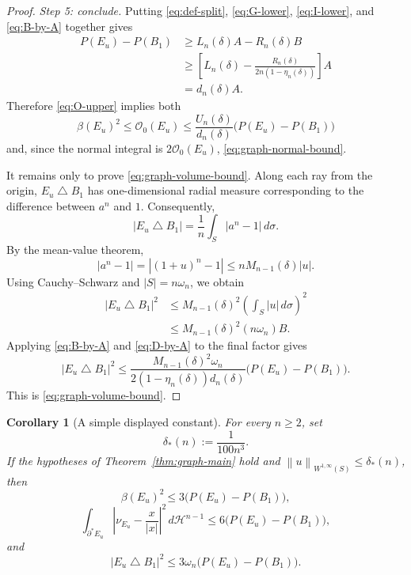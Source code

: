 \documentclass[11pt]{amsart}
\newtheorem{corollary}[theorem]{Corollary}
\theoremstyle{definition}
\newcommand{\Hn}{\mathcal H^{n-1}}
\newcommand{\Per}{P}
\newcommand{\norm}[1]{\left\|#1\right\|}
\newcommand{\osc}{\mathcal O}
\begin{document}
\begin{proof}
\smallskip\noindent\emph{Step 5: conclude.}
Putting \eqref{eq:def-split}, \eqref{eq:G-lower},
\eqref{eq:I-lower}, and \eqref{eq:B-by-A} together gives
\[
\begin{aligned}
   \Per(E_u)-\Per(B_1)
   &\ge L_n(\delta)A-R_n(\delta)B \\
   &\ge
   \left[
     L_n(\delta)-
     \frac{R_n(\delta)}{2n(1-\eta_n(\delta))}
   \right]A \\
   &=d_n(\delta)A.
\end{aligned}
\tag{3.36}\label{eq:D-by-A}
\]
Therefore \eqref{eq:O-upper} implies both
\[
   \beta(E_u)^2\le \osc_0(E_u)
   \le\frac{U_n(\delta)}{d_n(\delta)}
   \bigl(\Per(E_u)-\Per(B_1)\bigr)
\]
and, since the normal integral is \(2\osc_0(E_u)\),
\eqref{eq:graph-normal-bound}.

It remains only to prove \eqref{eq:graph-volume-bound}.  Along each ray from
the origin, \(E_u\mathbin{\triangle}B_1\) has one-dimensional radial measure
corresponding to the difference between \(a^n\) and \(1\).  Consequently,
\[
   |E_u\mathbin{\triangle}B_1|
   =\frac1n\int_S|a^n-1|\,d\sigma.
\tag{3.37}\label{eq:symdiff-formula}
\]
By the mean-value theorem,
\[
   |a^n-1|
   =|(1+u)^n-1|
   \le nM_{n-1}(\delta)|u|.
\]
Using Cauchy--Schwarz and \(|S|=n\omega_n\), we obtain
\[
\begin{aligned}
   |E_u\mathbin{\triangle}B_1|^2
   &\le M_{n-1}(\delta)^2
       \left(\int_S|u|\,d\sigma\right)^2 \\
   &\le M_{n-1}(\delta)^2(n\omega_n)B.
\end{aligned}
\tag{3.38}\label{eq:symdiff-B}
\]
Applying \eqref{eq:B-by-A} and \eqref{eq:D-by-A} to the final factor gives
\[
   |E_u\mathbin{\triangle}B_1|^2
   \le
   \frac{M_{n-1}(\delta)^2\omega_n}
        {2(1-\eta_n(\delta))d_n(\delta)}
       \bigl(\Per(E_u)-\Per(B_1)\bigr).
\]
This is \eqref{eq:graph-volume-bound}.
\end{proof}

\begin{corollary}[A simple displayed constant]\label{cor:graph-simple}
For every \(n\ge2\), set
\[
   \delta_*(n):=\frac1{100n^3}.
\tag{3.39}\label{eq:delta-star}
\]
If the hypotheses of Theorem~\ref{thm:graph-main} hold and
\(\norm{u}_{W^{1,\infty}(S)}\le\delta_*(n)\), then
\[
   \beta(E_u)^2
   \le3\bigl(\Per(E_u)-\Per(B_1)\bigr),
\tag{3.40}\label{eq:simple-beta}
\]
\[
   \int_{\partial^*E_u}
       \left|\nu_{E_u}-\frac{x}{|x|}\right|^2\,d\Hn
   \le6\bigl(\Per(E_u)-\Per(B_1)\bigr),
\tag{3.41}\label{eq:simple-normal}
\]
and
\[
   |E_u\mathbin{\triangle}B_1|^2
   \le3\omega_n\bigl(\Per(E_u)-\Per(B_1)\bigr).
\tag{3.42}\label{eq:simple-volume}
\]
\end{corollary}
\end{document}
